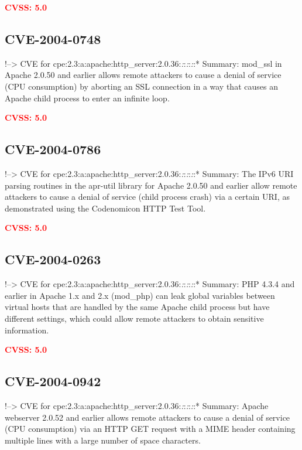 \documentclass[a4paper, 12pt]{article}
\begin{document}
\textbf{\textcolor{red}{CVSS: 5.0}}

\hypertarget{cve-2004-0748}{%
\subsection{CVE-2004-0748}\label{cve-2004-0748}}

!--\textgreater{} CVE for
cpe:2.3:a:apache:http\_server:2.0.36:\emph{:}:\emph{:}:\emph{:}:*
Summary: mod\_ssl in Apache 2.0.50 and earlier allows remote attackers
to cause a denial of service (CPU consumption) by aborting an SSL
connection in a way that causes an Apache child process to enter an
infinite loop.

\textbf{\textcolor{red}{CVSS: 5.0}}

\hypertarget{cve-2004-0786}{%
\subsection{CVE-2004-0786}\label{cve-2004-0786}}

!--\textgreater{} CVE for
cpe:2.3:a:apache:http\_server:2.0.36:\emph{:}:\emph{:}:\emph{:}:*
Summary: The IPv6 URI parsing routines in the apr-util library for
Apache 2.0.50 and earlier allow remote attackers to cause a denial of
service (child process crash) via a certain URI, as demonstrated using
the Codenomicon HTTP Test Tool.

\textbf{\textcolor{red}{CVSS: 5.0}}

\hypertarget{cve-2004-0263}{%
\subsection{CVE-2004-0263}\label{cve-2004-0263}}

!--\textgreater{} CVE for
cpe:2.3:a:apache:http\_server:2.0.36:\emph{:}:\emph{:}:\emph{:}:*
Summary: PHP 4.3.4 and earlier in Apache 1.x and 2.x (mod\_php) can leak
global variables between virtual hosts that are handled by the same
Apache child process but have different settings, which could allow
remote attackers to obtain sensitive information.

\textbf{\textcolor{red}{CVSS: 5.0}}

\hypertarget{cve-2004-0942}{%
\subsection{CVE-2004-0942}\label{cve-2004-0942}}

!--\textgreater{} CVE for
cpe:2.3:a:apache:http\_server:2.0.36:\emph{:}:\emph{:}:\emph{:}:*
Summary: Apache webserver 2.0.52 and earlier allows remote attackers to
cause a denial of service (CPU consumption) via an HTTP GET request with
a MIME header containing multiple lines with a large number of space
characters.
\end{document}
